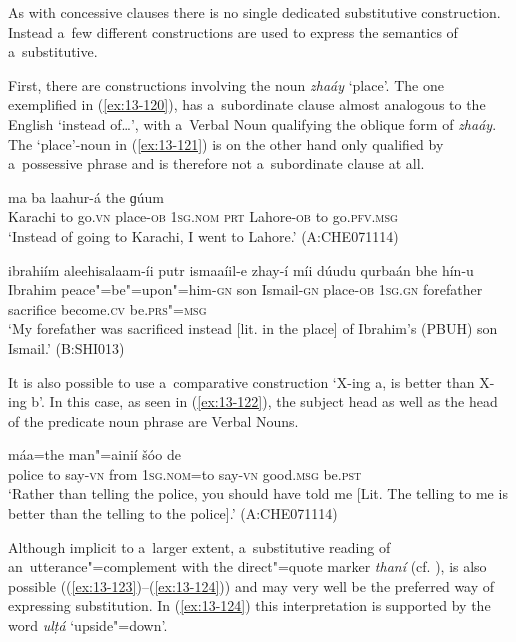  As with concessive clauses there is no single dedicated substitutive construction. Instead a~few different constructions are used to express the semantics of a~substitutive.


First, there are constructions involving the noun \textit{zhaáy} `place'. The one exemplified in (\ref{ex:13-120}), has a~subordinate clause almost analogous to the English `instead of{\ldots}', with a~Verbal Noun qualifying the oblique form of \textit{zhaáy}. The `place'-noun in (\ref{ex:13-121}) is on the other hand only qualified by a~possessive phrase and is therefore not a~subordinate clause at all. 

\begin{exe}
\ex
\label{ex:13-120}
 ma ba laahur-á  the ɡúum \\
Karachi to go.\textsc{vn} place-\textsc{ob} \textsc{1sg.nom} \textsc{prt} Lahore-\textsc{ob} to go.\textsc{pfv.msg} \\
\glt `Instead of going to Karachi, I went to Lahore.' (A:CHE071114)

\ex
\label{ex:13-121}
\gll ibrahiím aleehisalaam-íi putr ismaaíil-e zhay-í  míi dúudu qurbaán bhe hín-u \\
Ibrahim peace"=be"=upon"=him-\textsc{gn} son Ismail-\textsc{gn} place-\textsc{ob}  \textsc{1sg.gn} forefather sacrifice become.\textsc{cv} be.\textsc{prs"=msg} \\
\glt `My forefather was sacrificed instead [lit. in the place] of Ibrahim's (PBUH) son Ismail.' (B:SHI013) 
\end{exe}

It is also possible to use a~comparative construction `X-ing a, is better than X-ing b'. In this case, as seen in (\ref{ex:13-122}), the subject head as well as the head of the predicate noun phrase are Verbal Nouns.

\begin{exe}
\ex
\label{ex:13-122}
\gll [pulusá the man"=ainií díi] máa=the man"=ainií šóo de \\
police to say-\textsc{vn} from \textsc{1sg.nom=}to say-\textsc{vn} good.\textsc{msg} be.\textsc{pst} \\
\glt `Rather than telling the police, you should have told me [Lit. The telling to me is better than the telling to the police].' (A:CHE071114) 
\end{exe}

Although implicit to a~larger extent, a~substitutive reading of an~utterance"=complement with the direct"=quote marker \textit{thaní} (cf. ), is also possible ((\ref{ex:13-123})--(\ref{ex:13-124})) and may very well be the preferred way of expressing substitution. In (\ref{ex:13-124}) this interpretation is supported by the word \textit{ulṭá} `upside"=down'.


